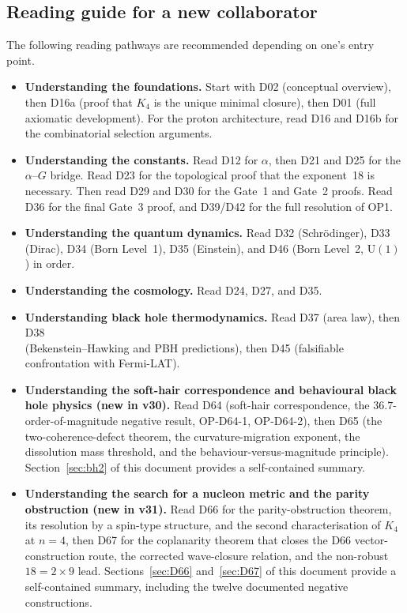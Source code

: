 \documentclass[11pt,a4paper]{article}
\theoremstyle{plain}
\theoremstyle{definition}
\theoremstyle{remark}
\begin{document}
\subsection{Reading guide for a new collaborator}
\label{subsec:readingguide}
The following reading pathways are recommended depending on one's entry point.

\begin{itemize}
\item \textbf{Understanding the foundations.} Start with D02 (conceptual overview), then D16a (proof that $K_4$ is the unique minimal closure), then D01 (full axiomatic development). For the proton architecture, read D16 and D16b for the combinatorial selection arguments.
\item \textbf{Understanding the constants.} Read D12 for $\alpha$, then D21 and D25 for the $\alpha$--$G$ bridge. Read D23 for the topological proof that the exponent~18 is necessary. Then read D29 and D30 for the Gate~1 and Gate~2 proofs. Read D36 for the final Gate~3 proof, and D39/D42 for the full resolution of OP1.
\item \textbf{Understanding the quantum dynamics.} Read D32 (Schr\"odinger), D33 (Dirac), D34 (Born Level~1), D35 (Einstein), and D46 (Born Level~2, $\mathrm{U}(1)$) in order.
\item \textbf{Understanding the cosmology.} Read D24, D27, and D35.
\item \textbf{Understanding black hole thermodynamics.} Read D37 (area law), then D38 \\ (Bekenstein--Hawking and PBH predictions), then D45 (falsifiable confrontation with Fermi-LAT).
\item \textbf{Understanding the soft-hair correspondence and behavioural black hole physics (new in v30).} Read D64 (soft-hair correspondence, the $36.7$-order-of-magnitude negative result, OP-D64-1, OP-D64-2), then D65 (the two-coherence-defect theorem, the curvature-migration exponent, the dissolution mass threshold, and the behaviour-versus-magnitude principle). Section~\ref{sec:bh2} of this document provides a self-contained summary.
\item \textbf{Understanding the search for a nucleon metric and the parity obstruction (new in v31).} Read D66 for the parity-obstruction theorem, its resolution by a spin-type structure, and the second characterisation of $K_4$ at $n=4$, then D67 for the coplanarity theorem that closes the D66 vector-construction route, the corrected wave-closure relation, and the non-robust $18=2\times9$ lead. Sections~\ref{sec:D66} and~\ref{sec:D67} of this document provide a self-contained summary, including the twelve documented negative constructions.

\end{itemize}
\end{document}
